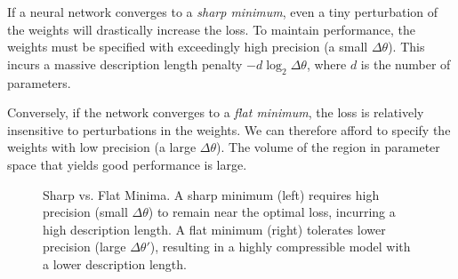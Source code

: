 If a neural network converges to a \textit{sharp minimum}, even a tiny perturbation of the weights will drastically increase the loss. To maintain performance, the weights must be specified with exceedingly high precision (a small $\Delta \theta$). This incurs a massive description length penalty $-d \log_2 \Delta \theta$, where $d$ is the number of parameters.

Conversely, if the network converges to a \textit{flat minimum}, the loss is relatively insensitive to perturbations in the weights. We can therefore afford to specify the weights with low precision (a large $\Delta \theta$). The volume of the region in parameter space that yields good performance is large.

\begin{figure}[htbp]
\centering
{}
\caption{Sharp vs. Flat Minima. A sharp minimum (left) requires high precision (small $\Delta \theta$) to remain near the optimal loss, incurring a high description length. A flat minimum (right) tolerates lower precision (large $\Delta \theta'$), resulting in a highly compressible model with a lower description length.}
\label{fig:minima}
\end{figure}

